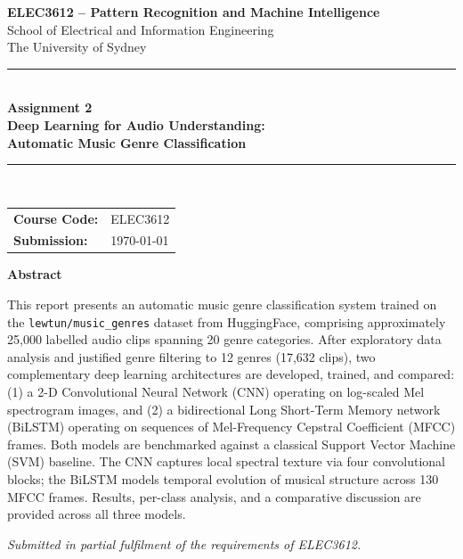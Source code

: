 \documentclass[12pt, a4paper]{article}
\begin{document}
\begin{titlepage}
    \centering
    \vspace*{1.5cm}

    {\Large \textbf{ELEC3612 -- Pattern Recognition and Machine Intelligence}}\\[0.4cm]
    {\large School of Electrical and Information Engineering}\\[0.2cm]
    {\large The University of Sydney}\\[1.5cm]

    \rule{\linewidth}{1pt}\\[0.5cm]
    {\LARGE \textbf{Assignment 2}}\\[0.3cm]
    {\Large \textbf{Deep Learning for Audio Understanding:}}\\[0.2cm]
    {\Large \textbf{Automatic Music Genre Classification}}\\[0.3cm]
    \rule{\linewidth}{1pt}\\[1.5cm]

    \begin{tabular}{ll}
        \textbf{Course Code:}   & ELEC3612 \\[4pt]
        \textbf{Submission:}    & \today \\
    \end{tabular}

    \vspace{2.5cm}

    {\large \textbf{Abstract}}\\[0.4cm]
    \begin{minipage}{0.88\textwidth}
    \small
    \setlength{\parskip}{4pt}
    This report presents an automatic music genre classification system trained on the     \texttt{lewtun/music\_genres} dataset from HuggingFace, comprising approximately
    25{,}000 labelled audio clips spanning 20 genre categories. After exploratory data
    analysis and justified genre filtering to 12 genres (17{,}632 clips), two complementary
    deep learning architectures are developed, trained, and compared: (1) a 2-D
    Convolutional Neural Network (CNN) operating on log-scaled Mel spectrogram images, and
    (2) a bidirectional Long Short-Term Memory network (BiLSTM) operating on sequences of
    Mel-Frequency Cepstral Coefficient (MFCC) frames. Both models are benchmarked against
    a classical Support Vector Machine (SVM) baseline. The CNN captures local spectral
    texture via four convolutional blocks; the BiLSTM models temporal evolution of musical
    structure across 130 MFCC frames. Results, per-class analysis, and a comparative
    discussion are provided across all three models.
    \end{minipage}

    \vfill
    {\small \textit{Submitted in partial fulfilment of the requirements of ELEC3612.}}
\end{titlepage}
\end{document}
